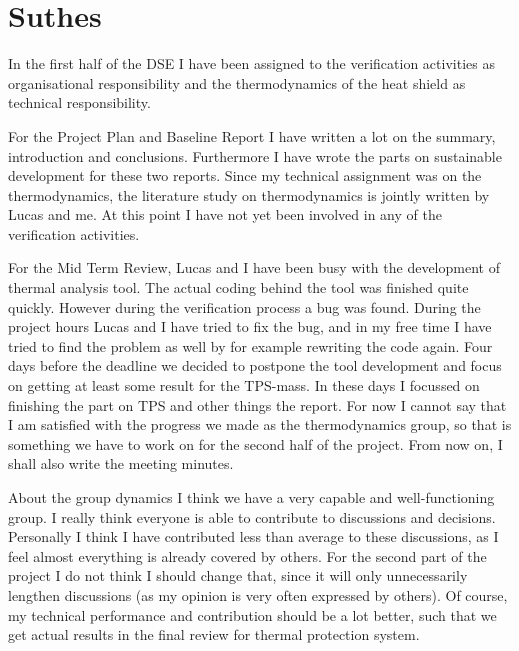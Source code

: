 \section{Suthes}

In the first half of the DSE I have been assigned to the verification activities as organisational responsibility and the thermodynamics of the heat shield as technical responsibility.

For the Project Plan and Baseline Report I have written a lot on the summary, introduction and conclusions. Furthermore I have wrote the parts on sustainable development for these two reports. Since my technical assignment was on the thermodynamics, the literature study on thermodynamics is jointly written by Lucas and me. At this point I have not yet been involved in any of the verification activities.

For the Mid Term Review, Lucas and I have been busy with the development of thermal analysis tool. The actual coding behind the tool was finished quite quickly. However during the verification process a bug was found. During the project hours Lucas and I have tried to fix the bug, and in my free time I have tried to find the problem as well by for example rewriting the code again. Four days before the deadline we decided to postpone the tool development and focus on getting at least some result for the TPS-mass. In these days I focussed on finishing the part on TPS and other things the report. For now I cannot say that I am satisfied with the progress we made as the thermodynamics group, so that is something we have to work on for the second half of the project. From now on, I shall also write the meeting minutes.

About the group dynamics I think we have a very capable and well-functioning group. I really think everyone is able to contribute to discussions and decisions. Personally I think I have contributed less than average to these discussions, as I feel almost everything is already covered by others. For the second part of the project I do not think I should change that, since it will only unnecessarily lengthen discussions (as my opinion is very often expressed by others). Of course, my technical performance and contribution should be a lot better, such that we get actual results in the final review for thermal protection system.